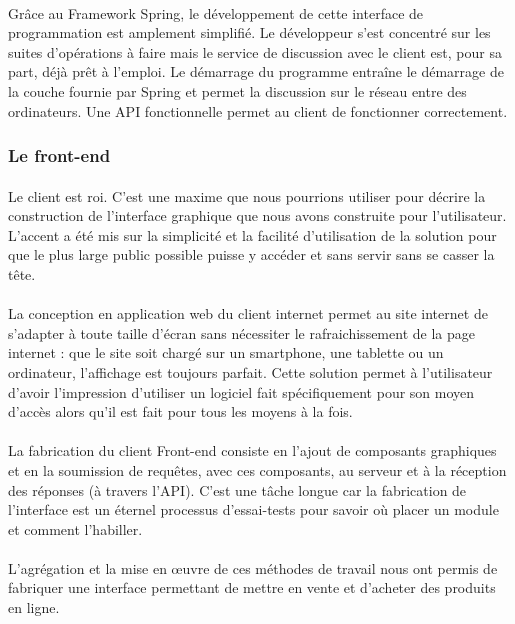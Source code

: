 \documentclass[a4paper, 12pt]{article}
\begin{document}
\paragraph{}Grâce au Framework Spring, le développement de cette interface de programmation est amplement simplifié. Le développeur s’est concentré sur les suites d’opérations à faire mais le service de discussion avec le client est, pour sa part, déjà prêt à l’emploi. Le démarrage du programme entraîne le démarrage de la couche fournie par Spring et permet la discussion sur le réseau entre des ordinateurs.
\noindent Une API fonctionnelle permet au client de fonctionner correctement.

\subsubsection{Le front-end}

\paragraph{}Le client est roi. C’est une maxime que nous pourrions utiliser pour décrire la construction de l’interface graphique que nous avons construite pour l’utilisateur. L’accent a été mis sur la simplicité et la facilité d’utilisation de la solution pour que le plus large public possible puisse y accéder et sans servir sans se casser la tête.
\paragraph{}La conception en application web du client internet permet au site internet de s’adapter à toute taille d’écran sans nécessiter le rafraichissement de la page internet : que le site soit chargé sur un smartphone, une tablette ou un ordinateur, l’affichage est toujours parfait. Cette solution permet à l’utilisateur d’avoir l’impression d’utiliser un logiciel fait spécifiquement pour son moyen d’accès alors qu’il est fait pour tous les moyens à la fois.
\paragraph{}La fabrication du client Front-end consiste en l’ajout de composants graphiques et en la soumission de requêtes, avec ces composants, au serveur et à la réception des réponses (à travers l’API). C’est une tâche longue car la fabrication de l’interface est un éternel processus d’essai-tests pour savoir où placer un module et comment l’habiller.
\paragraph{}L’agrégation et la mise en œuvre de ces méthodes de travail nous ont permis de fabriquer une interface permettant de mettre en vente et d’acheter des produits en ligne.
\end{document}
